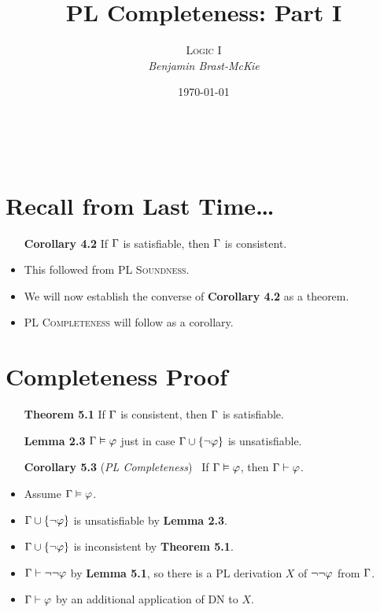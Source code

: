 \documentclass[a4paper, 11pt]{article} %
\title{\textbf{PL Completeness: Part I}} %
\author{\textsc{Logic I}\\ \em Benjamin Brast-McKie} %
\date{\today} %
\makeatletter
\renewcommand{\maketitle}{
\begin{flushright}
{\LARGE\@title}

\vspace{10pt}

{\@author}
\\ \@date
\end{flushright}

\vspace{-40pt}

}
\makeatother
\begin{document}
\maketitle %

\thispagestyle{empty}


\section*{Recall from Last Time\ldots}

\begin{itemize}
  \item[\bf Corollary 4.2] If $\Gamma$ is satisfiable, then $\Gamma$ is consistent.
    \item This followed from \textsc{PL Soundness}.
    \item We will now establish the converse of \textbf{Corollary 4.2} as a theorem.
    \item \textsc{PL Completeness} will follow as a corollary.
\end{itemize}




\section*{Completeness Proof}

\begin{itemize}
  \item[\bf Theorem 5.1] If $\Gamma$ is consistent, then $\Gamma$ is satisfiable.
  \item[\bf Lemma 2.3] $\Gamma \vDash \varphi$ just in case $\Gamma \cup \lbrace\neg \varphi\rbrace$ is unsatisfiable. 
  \item[\bf Corollary 5.3] (\textit{PL Completeness})~ If $\Gamma\vDash\varphi$, then $\Gamma\vdash\varphi$.
  \item Assume $\Gamma\vDash\varphi$.
  \item $\Gamma\cup\lbrace\neg\varphi\rbrace$ is unsatisfiable by \textbf{Lemma 2.3}.
  \item $\Gamma\cup\lbrace\neg\varphi\rbrace$ is inconsistent by \textbf{Theorem 5.1}.
  \item $\Gamma\vdash\neg\neg\varphi$ by \textbf{Lemma 5.1}, so there is a PL derivation $X$ of $\neg \neg \varphi$ from $\Gamma$.
  \item $\Gamma\vdash\varphi$ by an additional application of DN to $X$.
\end{itemize}
\end{document}
